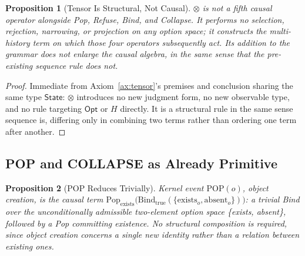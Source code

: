 \documentclass[11pt]{article}
\newtheorem{proposition}{Proposition}[section]
\begin{document}
\begin{proposition}[Tensor Is Structural, Not Causal]
\label{prop:tensor-structural}
$\otimes$ is not a fifth causal operator alongside Pop, Refuse, Bind, and Collapse. It performs no selection, rejection, narrowing, or projection on any option space; it constructs the multi-history term on which those four operators subsequently act. Its addition to the grammar does not enlarge the causal algebra, in the same sense that the pre-existing sequence rule does not.
\end{proposition}
\begin{proof}
Immediate from Axiom~\ref{ax:tensor}'s premises and conclusion sharing the same type $\mathsf{State}$: $\otimes$ introduces no new judgment form, no new observable type, and no rule targeting $\mathsf{Opt}$ or $H$ directly. It is a structural rule in the same sense sequence is, differing only in combining two terms rather than ordering one term after another.
\end{proof}

\subsection{POP and COLLAPSE as Already Primitive}

\begin{proposition}[POP Reduces Trivially]
\label{prop:pop-trivial}
Kernel event $\mathrm{POP}(o)$, object creation, is the causal term $\mathrm{Pop}_{\mathrm{exists}}\big(\mathrm{Bind}_{\mathrm{true}}(\{\mathrm{exists}_o, \mathrm{absent}_o\})\big)$: a trivial Bind over the unconditionally admissible two-element option space \{exists, absent\}, followed by a Pop committing existence. No structural composition is required, since object creation concerns a single new identity rather than a relation between existing ones.
\end{proposition}
\end{document}
